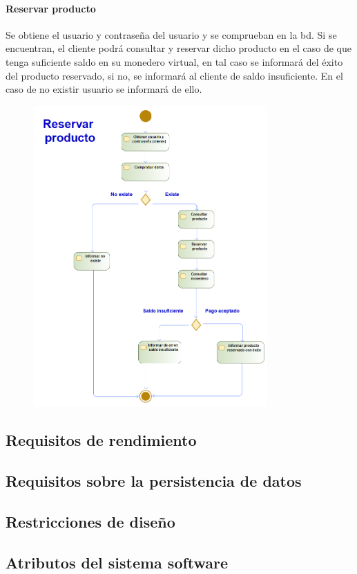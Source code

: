 \paragraph{Reservar producto}
Se obtiene el usuario y contraseña del usuario y se comprueban en la \gls{bd}. Si se encuentran, el cliente podrá consultar y reservar dicho producto en el caso de que tenga suficiente saldo en su monedero virtual, en tal caso se informará del éxito del producto reservado, si no, se informará al cliente de saldo insuficiente. En el caso de no existir usuario se informará de ello.
\begin{figure}[H]
    \centering
    \includegraphics[width=0.8\textwidth]{Use_Cases/reservar_producto.png}
\end{figure}
\subsection{Requisitos de rendimiento}
\subsection{Requisitos sobre la persistencia de datos}
\subsection{Restricciones de diseño}
\subsection{Atributos del sistema software}
